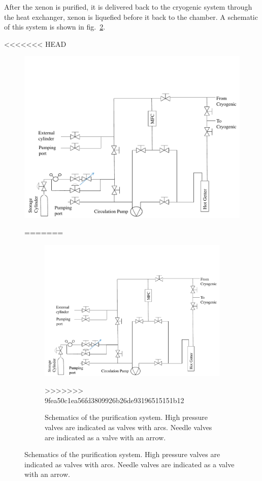 After the xenon is purified, it is delivered back to the cryogenic system 
through the heat exchanger,  xenon is 
liquefied before it  back to the chamber. A schematic of this 
system is shown in fig.~\ref{fig:gasSchematic}.


<<<<<<< HEAD
\begin{figure}[h]
\centerline{\includegraphics[width=1.\linewidth]{GasSchematics.pdf}}
\caption{Schematics of the purification system. High pressure valves are indicated as 
valves with arcs. Needle valves are indicated as a valve with an arrow.}
=======
\begin{figure}[t!]
\centerline{\includegraphics[width=0.75\linewidth]{GasSchematics.pdf}}
\caption{Schematics of the purification system. High pressure valves are indicated as valves with arcs. Needle valves are indicated as 
a valve with an arrow.}
>>>>>>> 9fea50c1ea56fd3809926b26de93196515151b12
\label{fig:gasSchematic}
\end{figure}


\end{figure}
